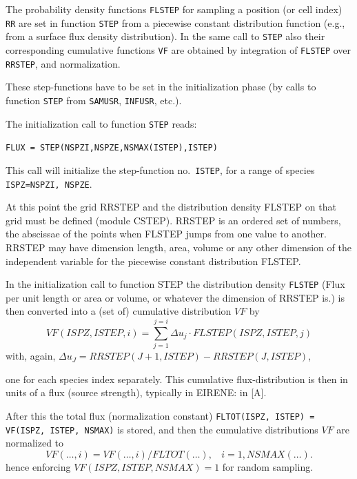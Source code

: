The probability density functions \lstinline|FLSTEP| for sampling a
position (or cell index) \lstinline|RR| are set in function
\lstinline|STEP| from a piecewise constant distribution function (e.g.,
from a surface flux density distribution).
In the same call to \lstinline|STEP| also their corresponding cumulative
functions \lstinline|VF| are obtained by integration of
\lstinline|FLSTEP| over \lstinline|RRSTEP|, and normalization.

These step-functions have to be set in the initialization phase (by calls to
function \lstinline|STEP| from \lstinline|SAMUSR|, \lstinline|INFUSR|, etc.).

The initialization call to function \lstinline|STEP| reads:

\lstinline|FLUX = STEP(NSPZI,NSPZE,NSMAX(ISTEP),ISTEP)|

This call will initialize the step-function no.\ \lstinline|ISTEP|, for a
range of species \lstinline|ISPZ=NSPZI, NSPZE|.

At this point the grid RRSTEP and the distribution density FLSTEP on that grid
must be defined (module CSTEP).
RRSTEP is an ordered set of numbers, the abscissae of the points when FLSTEP
jumps from one value to another.
RRSTEP may have dimension length, area, volume or any other dimension of the
independent variable for the piecewise constant distribution FLSTEP.

In the initialization call to function STEP the distribution density
\lstinline|FLSTEP| (Flux per unit length or area or volume, or whatever the 
dimension of RRSTEP is.) is then converted into a (set of) cumulative
distribution $VF$ by
\begin{equation}
  \nonumber
  VF(ISPZ,ISTEP,i)= \sum_{j=1}^{j=i} \Delta u_j \cdot FLSTEP(ISPZ,ISTEP,j)
\end{equation}
with, again, $\Delta u_J=RRSTEP(J+1,ISTEP)-RRSTEP(J,ISTEP)$,

one for each species index separately.
This cumulative flux-distribution is then in units of a flux (source strength),
typically in EIRENE: in [\si{\ampere}].

After this the total flux (normalization constant) 
\lstinline|FLTOT(ISPZ, ISTEP) = VF(ISPZ, ISTEP, NSMAX)| is
stored, and then the cumulative distributions $VF$ are normalized to
\begin{equation}
  \nonumber VF(\dots,i) = VF(\dots,i)/FLTOT(\dots),  \ \ \ \
  i=1,NSMAX(\dots).
\end{equation}
hence enforcing $VF(ISPZ,ISTEP,NSMAX) = 1$ for random sampling.


